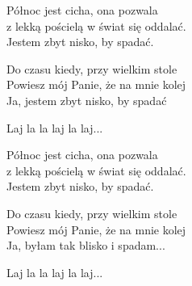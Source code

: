 \begin{text}
    Północ jest cicha, ona pozwala\\
    z lekką pościelą w świat się oddalać.\\
    Jestem zbyt nisko, by spadać.

    Do czasu kiedy, przy wielkim stole\\
    Powiesz mój Panie, że na mnie kolej\\
    Ja, jestem zbyt nisko, by spadać

    Laj la la laj la laj...

    Północ jest cicha, ona pozwala\\
    z lekką pościelą w świat się oddalać.\\
    Jestem zbyt nisko, by spadać.

    Do czasu kiedy, przy wielkim stole\\
    Powiesz mój Panie, że na mnie kolej\\
    Ja, byłam tak blisko i spadam...

    Laj la la laj la laj...
\end{text}
\begin{chord}

\end{chord}